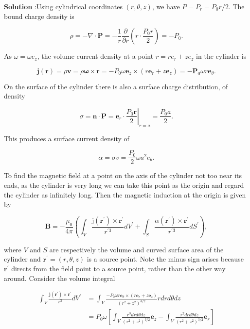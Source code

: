 \documentclass[10pt]{article}
\begin{document}
\textbf{Solution} :Using cylindrical coordinates $(r, \theta, z)$, we have $P=P_{r}=P_{0} r / 2$. The bound charge density is

$$
\rho=-\nabla \cdot \mathbf{P}=-\frac{1}{r} \frac{\partial}{\partial r}\left(r \cdot \frac{P_{0} r}{2}\right)=-P_{0} .
$$

 As $\omega=\omega e_{z}$, the volume current density at a point $r=r e_{r}+z e_{z}$ in the cylinder is

$$
\mathbf{j}(\mathbf{r})=\rho \mathbf{v}=\rho \boldsymbol{\omega} \times \mathbf{r}=-P_{0} \omega \mathbf{e}_{z} \times\left(r \mathbf{e}_{r}+z \mathbf{e}_{z}\right)=-\mathbf{P}_{0} \omega r \mathbf{e}_{\theta} .
$$

On the surface of the cylinder there is also a surface charge distribution, of density

$$
\sigma=\mathbf{n} \cdot \mathbf{P}=\left.\mathbf{e}_{r} \cdot \frac{P_{0} \mathbf{r}}{2}\right|_{r=a}=\frac{P_{0} a}{2} .
$$

This produces a surface current density of

$$
\alpha=\sigma v=\frac{P_{0}}{2} \omega a^{2} e_{\theta} .
$$

To find the magnetic field at a point on the axis of the cylinder not too near its ends, as the cylinder is very long we can take this point as the origin and regard the cylinder as infinitely long. Then the magnetic induction at the origin is given by

$$
\mathbf{B}=-\frac{\mu_{0}}{4 \pi}\left(\int_{V} \frac{\mathrm{j}\left(\mathbf{r}^{\prime}\right) \times \mathbf{r}^{\prime}}{r^{\prime 3}} d V^{\prime}+\int_{S} \frac{\alpha\left(\mathbf{r}^{\prime}\right) \times \mathbf{r}^{\prime}}{r^{\prime 3}} d S^{\prime}\right),
$$

where $V$ and $S$ are respectively the volume and curved surface area of the cylinder and $\mathbf{r}^{\prime}=(r, \theta, z)$ is a source point. Note the minus sign arises because $\mathbf{r}^{\prime}$ directs from the field point to a source point, rather than the other way around. Consider the volume integral

$$
\begin{aligned}
\int_{V} \frac{\mathbf{j}\left(\mathbf{r}^{\prime}\right) \times \mathbf{r}^{\prime}}{r^{3}} d V^{\prime} &=\int_{V} \frac{-P_{0} \omega r \mathbf{e}_{\theta} \times\left(r \mathbf{e}_{r}+z \mathbf{e}_{z}\right)}{\left(r^{2}+z^{2}\right)^{3 / 2}} r d r d \theta d z \\
&=P_{0} \omega\left[\int_{V} \frac{r^{3} d r d \theta d z}{\left(r^{2}+z^{2}\right)^{3 / 2}} \mathbf{e}_{z}-\int_{V} \frac{r^{2} d r d \theta d z}{\left(r^{2}+z^{2}\right)^{3 / 2}} \mathbf{e}_{r}\right]
\end{aligned}
$$
\end{document}
